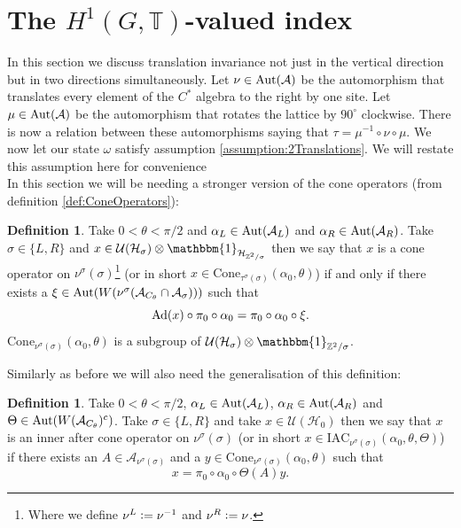 \documentclass[12pt,a4paper,twoside]{article}
\newcommand{\IAC}{\textrm{IAC}}
\newcommand{\defeq}{\vcentcolon=}
\let\originalleft\left
\let\originalright\right
\renewcommand{\left}{\mathopen{}\mathclose\bgroup\originalleft}
\renewcommand{\right}{\aftergroup\egroup\originalright}
\newcommand{\UU}{\mathcal U}
\newcommand{\HH}{\mathcal H}
\newcommand{\ZZ}{\mathbb Z}
\newcommand{\TT}{\mathbb T}
\renewcommand{\AA}{\mathcal A}
\newcommand{\id}{\mathbbm{1}}
\newcommand{\Ad}[1]{\textrm{Ad}\left(#1\right)}
\newcommand{\Aut}[1]{\textrm{Aut}\left(#1\right)}
\theoremstyle{definition}
\newtheorem{definition}[theorem]{Definition}
\numberwithin{equation}{section}
\begin{document}
\section{The $H^1(G,\TT)$-valued index}\label{sec:TwoDirectionTraslationInvariance}
In this section we discuss translation invariance not just in the vertical direction but in two directions simultaneously. Let $\nu\in\Aut{\AA}$ be the automorphism that translates every element of the $C^*$ algebra to the right by one site. Let $\mu\in\Aut{\AA}$ be the automorphism that rotates the lattice by $90^\circ$ clockwise. There is now a relation between these automorphisms saying that $\tau=\mu^{-1}\circ\nu\circ\mu$. We now let our state $\omega$ satisfy assumption \ref{assumption:2Translations}. We will restate this assumption here for convenience
\assumptionTwo*$\:$\\
In this section we will be needing a stronger version of the cone operators (from definition \ref{def:ConeOperators}):
\begin{definition}
	Take $0<\theta<\pi/2$ and $\alpha_L\in\Aut{\AA_{L}}$ and $\alpha_R\in\Aut{\AA_{R}}$. Take $\sigma\in\{L,R\}$ and $x\in\UU(\HH_{\sigma})\otimes\id_{\HH_{\ZZ^2/\sigma}}$ then we say that $x$ is a cone operator on $\nu^\sigma(\sigma)$\footnote{Where we define $\nu^L\defeq \nu^{-1}$ and $\nu^R\defeq \nu$.} (or in short $x\in\textrm{Cone}_{\tau^\sigma(\sigma)}(\alpha_0,\theta)$) if and only if there exists a $\xi\in\Aut{W(\nu^\sigma(\AA_{C_\theta}\cap\AA_\sigma))}$ such that
	\begin{equation}
		\Ad{x}\circ\pi_0\circ\alpha_0=\pi_0\circ\alpha_0\circ\xi.
	\end{equation}
	$\textrm{Cone}_{\nu^\sigma(\sigma)}(\alpha_0,\theta)$ is a subgroup of $\UU(\HH_\sigma)\otimes\id_{\ZZ^2/\sigma}$.
\end{definition}
Similarly as before we will also need the generalisation of this definition:
\begin{definition}
	Take $0<\theta<\pi/2$, $\alpha_L\in\Aut{\AA_{L}}$, $\alpha_R\in\Aut{\AA_{R}}$ and $\Theta\in\Aut{W(\AA_{C_\theta})^c}$. Take $\sigma\in\{L,R\}$ and take $x\in\UU(\HH_0)$ then we say that $x$ is an inner after cone operator on $\nu^\sigma(\sigma)$ (or in short $x\in \IAC_{\nu^\sigma(\sigma)}(\alpha_0,\theta,\Theta)$) if there exists an $A\in\AA_{\nu^\sigma(\sigma)}$ and a $y\in\textrm{Cone}_{\nu^\sigma(\sigma)}(\alpha_0,\theta)$ such that
	\begin{equation}
		x=\pi_0\circ\alpha_0\circ\Theta(A)y.
	\end{equation}
\end{definition}
\end{document}
